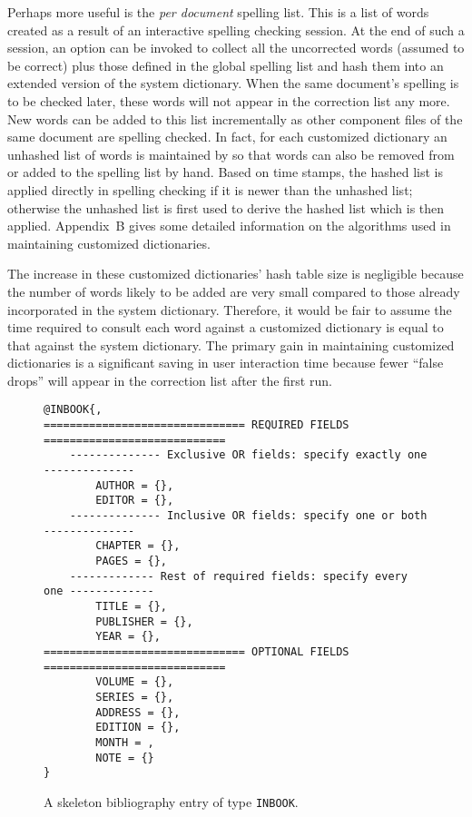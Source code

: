 Perhaps more useful is the {\it per document\/} spelling list.
This is a list of words created as a result of
an interactive spelling checking session.  At the end of such a session,
an option can be invoked to collect all the uncorrected words
(assumed to be correct) plus those defined in the global spelling list
and hash them into an extended version of the system dictionary.
When the same document's spelling is to be checked later, these words
will not appear in the correction list any more.  New words can be added
to this list incrementally as other component files
of the same document are spelling checked.
In fact, for each customized dictionary an unhashed list of
words is maintained by {\TM} so that words can also be removed from
or added to the spelling list by hand.
Based on time stamps, the hashed list is applied directly
in spelling checking if it is newer than the unhashed list;
otherwise the unhashed list is first used to derive the hashed list which is
then applied.  Appendix~B gives some detailed information on the algorithms
used in maintaining customized dictionaries.

The increase in these customized dictionaries' hash table size is
negligible because the number of words likely to be added are very small
compared to those already incorporated in the system dictionary.
Therefore, it would be fair to assume the time required to consult
each word against a customized dictionary is equal to that against
the system dictionary.
The primary gain in maintaining customized dictionaries is a significant saving
in user interaction time because fewer ``false drops'' will appear
in the correction list after the first run.

\begin{figure}
\begin{verbatim}
@INBOOK{,
=============================== REQUIRED FIELDS ============================
    -------------- Exclusive OR fields: specify exactly one --------------
        AUTHOR = {},
        EDITOR = {},
    -------------- Inclusive OR fields: specify one or both --------------
        CHAPTER = {},
        PAGES = {},
    ------------- Rest of required fields: specify every one -------------
        TITLE = {},
        PUBLISHER = {},
        YEAR = {},
=============================== OPTIONAL FIELDS ============================
        VOLUME = {},
        SERIES = {},
        ADDRESS = {},
        EDITION = {},
        MONTH = ,
        NOTE = {}
}
\end{verbatim}
\caption{A skeleton bibliography entry of type {\tt INBOOK}.}
\end{figure}

